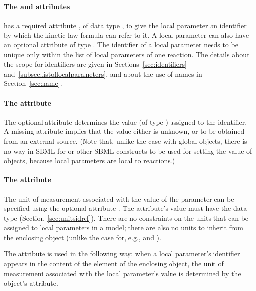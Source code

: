 \paragraph{The  and  attributes}

\LocalParameter has a required attribute , of data type
, to give the local parameter an identifier by which
the kinetic law formula can refer to it.  A local parameter can
also have an optional  attribute of type
.  The identifier of a local parameter needs to
be unique only within the list of local parameters of one
reaction.  The details about the scope for identifiers are given
in Sections~\ref{sec:identifiers}
and~\ref{subsec:listoflocalparameters}, and about the use of names
in Section~\ref{sec:name}.


\paragraph{The  attribute}

The optional attribute  determines the value (of type
) assigned to the identifier.  A missing
 attribute implies that the value either is unknown,
or to be obtained from an external source.  (Note that, unlike the
case with global \Parameter objects, there is no way in SBML
\thisLV for \InitialAssignment or other SBML constructs to be used
for setting the value of \LocalParameter objects, because local
parameters are local to reactions.)


\paragraph{The  attribute}

The unit of measurement associated with the value of the parameter
can be specified using the optional attribute .  The
attribute's value must have the data type 
(Section~\ref{sec:unitsidref}).  There are no constraints on the
units that can be assigned to local parameters in a model; there
are also no units to inherit from the enclosing \Model object
(unlike the case for, e.g., \Species and \Compartment).

The  attribute is used in the following way: when a
local parameter's identifier appears in the content of the
 element of the enclosing \KineticLaw object, the unit
of measurement associated with the local parameter's value is
determined by the \LocalParameter object's 
attribute.


